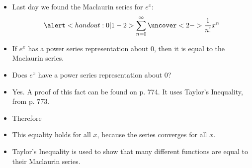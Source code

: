 \begin{frame}
\begin{itemize}
\item  Last day we found the Maclaurin series for $e^x$:
\abovedisplayskip=0pt
\belowdisplayskip=0pt
\[
\alert<handout:0| 1-2>{\sum_{n=0}^\infty \uncover<2->{\frac{1}{n!}}x^n}
\]
\item<3->  If $e^x$ has a power series representation about $0$, then it is equal to the Maclaurin series.
\item<3->  Does $e^x$ have a power series representation about $0$?
\item<4->  Yes.  A proof of this fact can be found on p. 774.  It uses Taylor's Inequality, from p. 773.
\item<5->  Therefore
%
\item<6->  This equality holds for all $x$, because the series converges for all $x$.
\item<7->  Taylor's Inequality is used to show that many different functions are equal to their Maclaurin series.
\end{itemize}
\end{frame}
